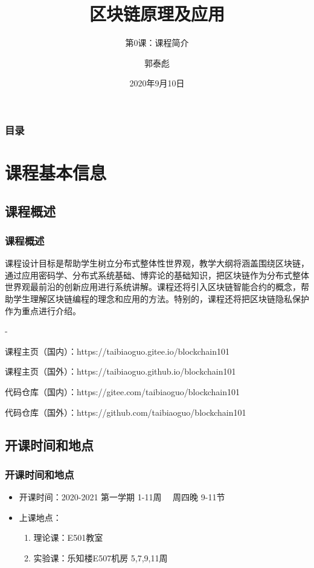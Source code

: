\documentclass[11pt]{beamer}
\begin{document}
\author{郭泰彪}
\title{区块链原理及应用}
\subtitle{第0课：课程简介}
\date{2020年9月10日}
\begin{frame}[plain]
	\maketitle
\end{frame}

\begin{frame}
	\frametitle{目录}
	\tableofcontents[sectionstyle=show,subsectionstyle=show/shaded]
\end{frame}

\section{课程基本信息}
\subsection{课程概述}
\begin{frame}
	\frametitle{课程概述}
	课程设计目标是帮助学生树立分布式整体性世界观，教学大纲将涵盖围绕区块链，通过应用密码学、分布式系统基础、博弈论的基础知识，把区块链作为分布式整体世界观最前沿的创新应用进行系统讲解。课程还将引入区块链智能合约的概念，帮助学生理解区块链编程的理念和应用的方法。特别的，课程还将把区块链隐私保护作为重点进行介绍。

	-

	\footnotesize {
	课程主页（国内）：https://taibiaoguo.git{\color{red}ee}.io/blockchain101

	课程主页（国外）：https://taibiaoguo.git{\color{red}hub}.io/blockchain101

	代码仓库（国内）：https://git{\color{red}ee}.com/taibiaoguo/blockchain101

	代码仓库（国外）：https://git{\color{red}hub}.com/taibiaoguo/blockchain101
	}
\end{frame}

\subsection{开课时间和地点}
\begin{frame}
	\frametitle{开课时间和地点}
	\begin{itemize}
		\item 开课时间：2020-2021 第一学期 1-11周 \ \ 周四晚 9-11节
		\item 上课地点：
		      \begin{enumerate}
			      \item 理论课：E501教室 
			      \item 实验课：乐知楼E507机房 5,7,9,11周
		      \end{enumerate}
	\end{itemize}
\end{frame}
\end{document}
